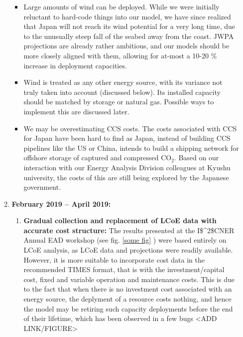 \documentclass[14pt,a4paper]{article} %
\begin{document}
\begin{itemize}
\begin{enumerate}
\begin{itemize}

\item Large amounts of wind can be deployed. While we were initially reluctant to hard-code things into our model, we have since realized that Japan will not reach its wind potential for a very long time, due to the unusually steep fall of the seabed away from the coast. \gls{JWPA} projections \cite{heger_wind_2016} are already rather ambitious, and our models should be more closely aligned with them, allowing for at-most a 10-20 \% increase in deployment capacities.

\item Wind is treated as any other energy source, with its variance not truly taken into account (discussed below). Its installed capacity should be matched by storage or natural gas. Possible ways to implement this are discussed later.

\item We may be overestimating \gls{CCS} costs. The costs associated with \gls{CCS} for Japan have been hard to find as Japan, instead of building \gls{CCS} pipelines like the US or China, intends to build a shipping network for offshore storage of captured and compressed CO$_2$. Based on our interaction with our Energy Analysis Division colleagues at Kyushu university, the costs of this are still being explored by the Japanese government.

\end{itemize}

\item \textbf{February 2019 – April 2019:}

\begin{enumerate}

\item \textbf{Gradual collection and replacement of \gls{LCoE} data with accurate cost structure:} The results presented at the \gls{I$^2$CNER} Annual \gls{EAD} workshop (see fig. \ref{some fig} ) were based entirely on \gls{LCoE} analysis, as \gls{LCoE} data and projections were readily available. However, it is more suitable to incorporate cost data in the recommended \gls{TIMES} format, that is with the investment/capital cost, fixed and variable operation and maintenance costs. This is due to the fact that when there is no investment cost associated with an energy source, the deplyment of a resource costs nothing, and hence the model may be retiring such capacity deployments before the end of their lifetime, which has been observed in a few bugs <ADD LINK/FIGURE>


\end{enumerate}
\end{enumerate}
\end{itemize}
\end{document}
